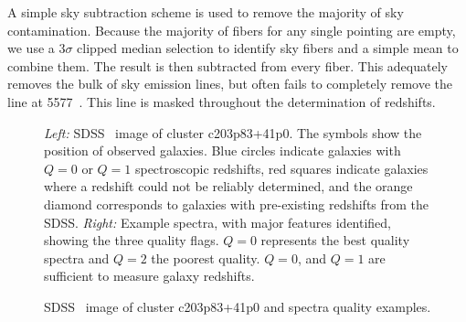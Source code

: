 A simple sky subtraction scheme is used to remove the majority of sky contamination. Because the majority of fibers for any single pointing are empty, we use a $3\sigma$ clipped median selection to identify sky fibers and a simple mean to combine them. The result is then subtracted from every fiber. This adequately removes the bulk of sky emission lines, but often fails to completely remove the \hbox{} line at 5577~\AAA. This line is masked throughout the determination of redshifts.

\begin{figure}[t]
\hfill
{}
	\caption{SDSS \sdssr\ image of cluster c203p83+41p0 and spectra quality examples.}
    \emph{Left:} SDSS \sdssr\ image of cluster c203p83+41p0. The symbols show the position of observed galaxies. Blue circles indicate galaxies with $Q=0$ or $Q=1$ spectroscopic redshifts, red squares indicate galaxies where a redshift could not be reliably determined, and the orange diamond corresponds to galaxies with pre-existing redshifts from the SDSS. \textit{Right:} Example spectra, with major features identified, showing the three quality flags. $Q=0$ represents the best quality spectra and $Q=2$ the poorest quality. $Q=0$, and $Q=1$ are sufficient to measure galaxy redshifts. 
	\label{2fig:c203p83+41p0}
\end{figure}

